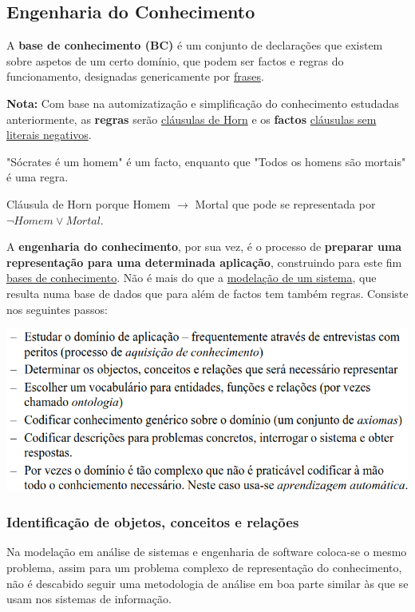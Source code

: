 \documentclass{article}
\begin{document}
\pagebreak

\subsection{Engenharia do Conhecimento}

A \textbf{base de conhecimento (BC)} é um conjunto de declarações que existem sobre aspetos de um certo
domínio, que podem ser factos e regras do funcionamento, designadas genericamente por
\uline{frases}.

\begin{flushleft}
  \textbf{Nota:} Com base na automizatização e simplificação do conhecimento estudadas anteriormente, as \textbf{regras} serão \uline{cláusulas de
  Horn} e os \textbf{factos} \uline{cláusulas sem literais negativos}.

  "Sócrates é um homem" é um facto, enquanto que "Todos os homens são mortais" é uma regra.

  Cláusula de Horn porque Homem $\rightarrow$ Mortal que pode se representada por $\neg Homem \vee Mortal$.
\end{flushleft}

A \textbf{engenharia do conhecimento}, por sua vez, é o processo de \textbf{preparar uma representação para
uma determinada aplicação}, construindo para este fim \uline{bases de conhecimento}. Não é mais do
que a \uline{modelação de um sistema}, que resulta numa base de dados que para além de factos
tem também regras. Consiste nos seguintes passos:

\begin{center}
  \includegraphics[scale=0.4]{43}
\end{center}

\subsubsection{Identificação de objetos,
conceitos e relações}

Na modelação em análise de sistemas e engenharia de software
coloca-se o mesmo problema, assim para um problema complexo de representação do conhecimento,
não é descabido seguir uma metodologia de análise em boa parte similar
às que se usam nos sistemas de informação.
\end{document}
